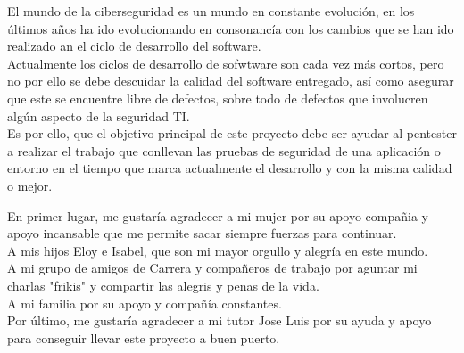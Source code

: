 \cleardoublepage
\thispagestyle{plain}
\begin{center}
\Large{}
\end{center}
\vskip1cm
\setlength{\parskip}{1em}
El mundo de la ciberseguridad es un mundo en constante evolución, en los últimos años ha ido evolucionando en consonancía
con los cambios que se han ido realizado an el ciclo de desarrollo del software.\\

Actualmente los ciclos de desarrollo de sofwtware son cada vez más cortos, pero no por ello se debe descuidar la calidad del 
software entregado,  así como asegurar que este se encuentre libre de defectos, sobre todo de defectos que involucren 
algún aspecto de la seguridad TI.\\

Es por ello, que el objetivo principal de este proyecto debe ser ayudar al pentester a realizar el trabajo que conllevan las pruebas de seguridad 
de una aplicación o entorno en el tiempo que marca actualmente el desarrollo y con la misma calidad o mejor.\\ 

\cleardoublepage
\thispagestyle{plain}
\begin{center}
\Large{}
\end{center}
\vskip1cm

En primer lugar, me gustaría agradecer a mi mujer por su apoyo compañia y apoyo incansable que me permite
sacar siempre fuerzas para continuar.\\

A mis hijos Eloy e Isabel, que son mi mayor orgullo y alegría en este mundo.\\

A mi grupo de amigos de Carrera y compañeros de trabajo por aguntar mi charlas "frikis" y compartir las alegris y penas de la vida.\\

A mi familia por su apoyo y compañía constantes.\\

Por último, me gustaría agradecer a mi tutor Jose Luis por su ayuda y apoyo para conseguir llevar este proyecto a buen puerto.\\
\setlength{\parskip}{0em}
